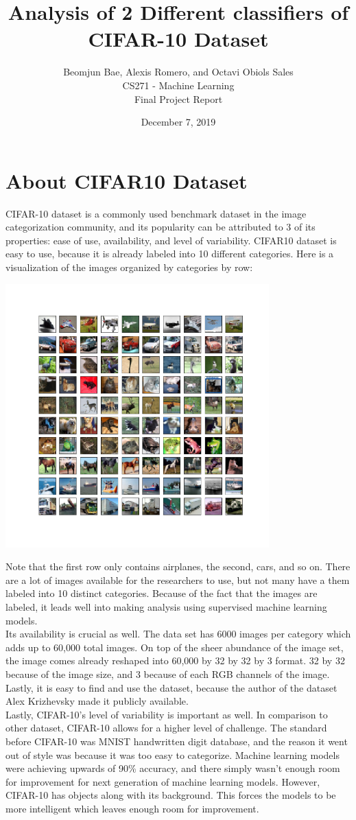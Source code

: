 \documentclass[12pt, a4paper]{article}
\title{Analysis of 2 Different classifiers of CIFAR-10 Dataset}
\date{December 7, 2019}
\author{Beomjun Bae, Alexis Romero, and Octavi Obiols Sales\\
CS271 - Machine Learning\\
Final Project Report}
\begin{document}
	\maketitle
	\section{About CIFAR10 Dataset}
		CIFAR-10 dataset is a commonly used benchmark dataset in the image categorization community, and its popularity can be attributed to 3 of its properties: ease of use, availability, and level of variability. CIFAR10 dataset is easy to use, because it is already labeled into 10 different categories. Here is a visualization of the images organized by categories by row:\\
		\centerline{\includegraphics[width=4in]{../figures/cifar10_organized.png}}
		Note that the first row only contains airplanes, the second, cars, and so on. There are a lot of images available for the researchers to use, but not many have a them labeled into 10 distinct categories. Because of the fact that the images are labeled, it leads well into making analysis using supervised machine learning models.\\
		Its availability is crucial as well. The data set has 6000 images per category which adds up to 60,000 total images. On top of the sheer abundance of the image set, the image comes already reshaped into 60,000 by 32 by 32 by 3 format. 32 by 32 because of the image size, and 3 because of each RGB channels of the image. Lastly, it is easy to find and use the dataset, because the author of the dataset Alex Krizhevsky made it publicly available.\\
		Lastly, CIFAR-10's level of variability is important as well. In comparison to other dataset, CIFAR-10 allows for a higher level of challenge. The standard before CIFAR-10 was MNIST handwritten digit database, and the reason it went out of style was because it was too easy to categorize. Machine learning models were achieving upwards of 90\% accuracy, and there simply wasn't enough room for improvement for next generation of machine learning models. However, CIFAR-10 has objects along with its background. This forces the models to be more intelligent which leaves enough room for improvement.
\end{document}
